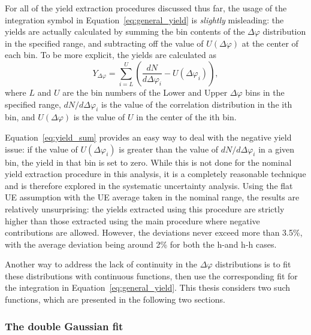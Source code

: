 For all of the yield extraction procedures discussed thus far, the usage of the integration symbol in Equation~\ref{eq:general_yield} is \textit{slightly} misleading: the yields are actually calculated by summing the bin contents of the $\Delta\varphi$ distribution in the specified range, and subtracting off the value of $U(\Delta\varphi)$ at the center of each bin. To be more explicit, the yields are calculated as
%
\begin{equation}
    \label{eq:yield_sum}
    Y_{\Delta\varphi} = \sum_{i=L}^{U} (\frac{dN}{d\Delta\varphi_{i}}- U(\Delta\varphi_{i})),
\end{equation}
%
where $L$ and $U$ are the bin numbers of the Lower and Upper $\Delta\varphi$ bins in the specified range, $dN/d\Delta\varphi_{i}$ is the value of the correlation distribution in the ith \dphi bin, and $U(\Delta\varphi)$ is the value of $U$ in the center of the ith \dphi bin. 

Equation~\ref{eq:yield_sum} provides an easy way to deal with the negative yield issue: if the value of $U(\Delta\varphi_{i})$ is greater than the value of $dN/d\Delta\varphi_{i}$ in a given bin, the yield in that bin is set to zero. While this is not done for the nominal yield extraction procedure in this analysis, it is a completely reasonable technique and is therefore explored in the systematic uncertainty analysis. Using the flat UE assumption with the UE average taken in the nominal range, the results are relatively unsurprising: the yields extracted using this procedure are strictly higher than those extracted using the main procedure where negative contributions are allowed. However, the deviations never exceed more than 3.5\%, with the average deviation being around 2\% for both the h-\lmb and h-h cases.

Another way to address the lack of continuity in the $\Delta\varphi$ distributions is to fit these distributions with continuous functions, then use the corresponding fit for the integration in Equation~\ref{eq:general_yield}. This thesis considers two such functions, which are presented in the following two sections.

\subsubsection{The double Gaussian fit}
\label{sec:double_gaus_fit}

